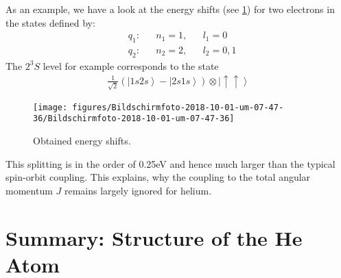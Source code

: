 \documentclass[10pt]{article}
\newcommand{\ket}[1]{\ensuremath{\left|#1\right\rangle}}
\begin{document}
As an example, we have a look at the energy shifts (see \ref{955156}) for two electrons in the states defined by:
%
\begin{align}
&q_1:& &n_1=1,& &l_1 = 0\\
&q_2:& &n_2=2,& &l_2= 0,1
\end{align}
%
The $2^3S$ level for example corresponds to the state
\begin{align}
\frac{1}{\sqrt{2}} \left( \ket{1s2s} - \ket{2s1s} \right) \otimes \ket{\uparrow \uparrow}
\end{align}
\begin{figure}[h!]
\begin{center}
\texttt{[image: figures/Bildschirmfoto-2018-10-01-um-07-47-36/Bildschirmfoto-2018-10-01-um-07-47-36]}
\caption{{Obtained energy shifts.
{\label{955156}}%
}}
\end{center}
\end{figure}

This splitting is in the order of 0.25eV and hence much larger than the typical spin-orbit coupling. This explains, why the coupling to the total angular momentum $J$ remains largely ignored for helium.

\section{Summary: Structure of the {He} Atom}
\end{document}
